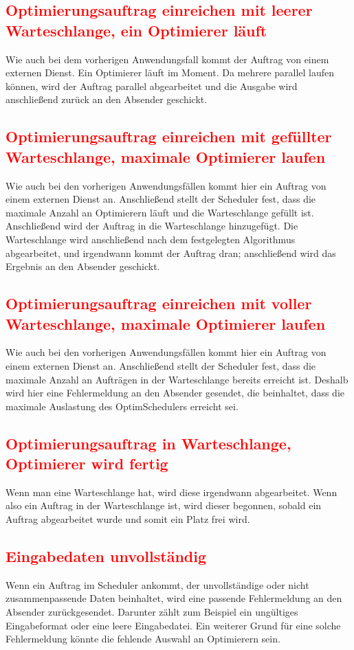\documentclass[
    12pt,               
    a4paper,            
    ngerman,            
    parskip=half,       
    headings=normal,   
    numbers=enddot,     
    toc=chapterentrywithdots 
]{scrreprt}\usepackage[utf8]{inputenc}
\begin{document}
\subsection{\textcolor{red}{Optimierungsauftrag einreichen mit leerer Warteschlange, ein Optimierer läuft}}
Wie auch bei dem vorherigen Anwendungsfall kommt der Auftrag von einem externen Dienst. Ein Optimierer läuft im Moment. Da mehrere parallel laufen können, wird der Auftrag parallel abgearbeitet und die Ausgabe wird anschließend zurück an den Absender geschickt.

\subsection{\textcolor{red}{Optimierungsauftrag einreichen mit gefüllter Warteschlange, maximale Optimierer laufen}}
Wie auch bei den vorherigen Anwendungsfällen kommt hier ein Auftrag von einem externen Dienst an. Anschließend stellt der Scheduler fest, dass die maximale Anzahl an Optimierern läuft und die Warteschlange gefüllt ist. Anschließend wird der Auftrag in die Warteschlange hinzugefügt. Die Warteschlange wird anschließend nach dem festgelegten Algorithmus abgearbeitet, und irgendwann kommt der Auftrag dran; anschließend wird das Ergebnis an den Absender geschickt.

\subsection{\textcolor{red}{Optimierungsauftrag einreichen mit voller Warteschlange, maximale Optimierer laufen}}
Wie auch bei den vorherigen Anwendungsfällen kommt hier ein Auftrag von einem externen Dienst an. Anschließend stellt der Scheduler fest, dass die maximale Anzahl an Aufträgen in der Warteschlange bereits erreicht ist. Deshalb wird hier eine Fehlermeldung an den Absender gesendet, die beinhaltet, dass die maximale Auslastung des OptimSchedulers erreicht sei.

\subsection{\textcolor{red}{Optimierungsauftrag in Warteschlange, Optimierer wird fertig}}
Wenn man eine Warteschlange hat, wird diese irgendwann abgearbeitet. Wenn also ein Auftrag in der Warteschlange ist, wird dieser begonnen, sobald ein Auftrag abgearbeitet wurde und somit ein Platz frei wird.

\subsection{\textcolor{red}{Eingabedaten unvollständig}}
Wenn ein Auftrag im Scheduler ankommt, der unvollständige oder nicht zusammenpassende Daten beinhaltet, wird eine passende Fehlermeldung an den Absender zurückgesendet. Darunter zählt zum Beispiel ein ungültiges Eingabeformat oder eine leere Eingabedatei. Ein weiterer Grund für eine solche Fehlermeldung könnte die fehlende Auswahl an Optimierern sein.
\end{document}
